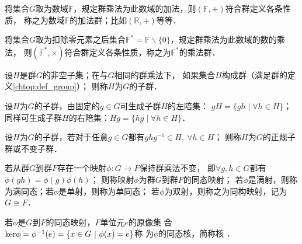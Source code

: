 \begin{example}
    将集合$G$取为数域$\mathbb{F}$，规定群乘法为此数域的加法，则$(\mathbb{F},+)$符合群定义各条性质，
    称之为数域$\mathbb{F}$的{\heiti 加法群}；比如$(\mathbb{R},+)$等等．
\end{example}


\begin{example}
    将集合$G$取为扣除零元素之后集合$\mathbb{F}^*=\mathbb{F}\backslash \{0\}$，规定群乘法为此数域的数的乘法，
    则$(\mathbb{F}^*,\times)$符合群定义各条性质，称之为$\mathbb{F}^*$的{\heiti 乘法群}．
\end{example}

    
\begin{definition}
    设$H$是群$G$的非空子集；在与$G$相同的群乘法下，
    如果集合$H$构成群（满足群的定义\ref{chtop:def_group}）；
    则称$H$为$G$的{\heiti 子群}．
\end{definition}

\begin{definition}
    设$H$为$G$的{子群}，由固定的$g\in G$可生成子群$H$的{\heiti 左陪集}：
    $g H = \{g h \mid \forall  h \in H \}$；
    同样可生成子群$H$的{\heiti 右陪集}：$ Hg = \{ h g  \mid \forall  h \in H \}$．
\end{definition}

\begin{definition}\label{chtop:def_normal-subgroup}
    设$H$为$G$的子群，若对于任意$g\in G$都有$g h g^{-1} \in H, \ \forall h\in H$；
    则称$H$为$G$的{\heiti 正规子群}或{\heiti 不变子群}．
\end{definition}
    
    
\begin{definition}\label{chtop:def_tttg}
    若从群$G$到群$F$存在一个映射$\phi:G\to F$保持群乘法不变，
    即$\forall g,h\in G$都有$\phi(gh)=\phi(g)\phi(h)$；
    则称映射$\phi$为群$G$到群$F$的{\heiti 同态映射}；
    若$\phi$是满射，则称为{\heiti 满同态}；若$\phi$是单射，则称为{\heiti 单同态}；
    若$\phi$为双射，则称之为{\heiti 同构映射}，记为$G \cong F$．
\end{definition}

    
\begin{definition}\label{chtop:def_kernel}
    若$\phi$是$G$到$F$的同态映射，$F$单位元$e$的原像集
    合${\rm ker}\phi = \phi^{-1}(e)=\{x\in G \ |\ \phi(x)=e\}$称
    为$\phi$的{\heiti 同态核}，简称{\heiti 核} ．
\end{definition}

